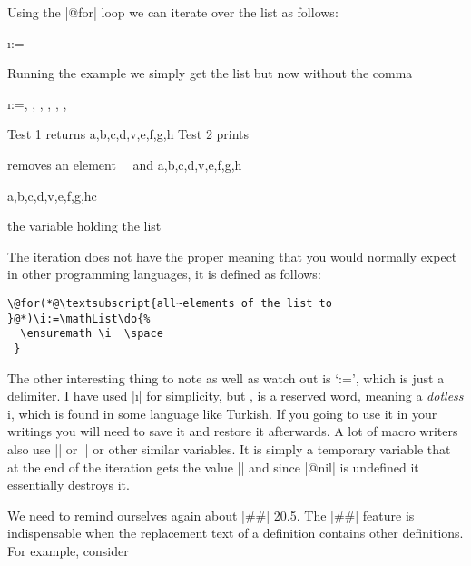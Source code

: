 Using the |@for| loop we can iterate over the list as follows:

\begin{teX}
\@for\i:=\mathList\do{%
  \ensuremath \i  \space 
 }
\end{teX}

\parindent0pt

Running the example we simply get the list but now without the comma

\begin{teX}
\makeatletter
\def\mathList{\alpha, \beta, \gamma, \delta, \epsilon, \zeta, \theta }
\@for\i:=\mathList\do{%
  \ensuremath \i  \space 
 }
\makeatother
\end{teX}




\begin{teX}
\makeatletter
\def\atestiii{}
\def\alist{a,b,c,d,v,e,f,g,h}
Test 1 \@removeelement{v}{a,b,c,d,v,e,f,g,h}{\atestiii} 
returns \atestiii
\alist
\gdef\blist{1,2,3,4,5,v,6,7}%
Test 2 \@removeelement{v}{\expand\blist}{\atestii} prints \atestii
\meaning\atestii
\meaning\@removeelement

\def\remove#1#2{
 \@removeelement #2{#1}\atestiii \atestiii
}

removes an element \atestiii ~~and \alist

\remove c\alist 


the variable holding the list \atestiii
\end{teX}


The iteration does not have the proper meaning that you would normally expect in other programming languages, it is defined as follows:


\begin{verbatim}
\@for(*@\textsubscript{all~elements of the list to }@*)\i:=\mathList\do{%
  \ensuremath \i  \space 
 }
\end{verbatim}

The other interesting thing to note as well as watch out is `:=', which is just a delimiter. I have used |\i| for simplicity, but \cmd{\i}, is a reserved word, meaning a \textit{dotless} i, which is found in some language like Turkish. If you going to use it in your writings you will need to save it and restore it afterwards. A lot of macro writers also use |\ii| or |\@i| or other similar variables. It is simply a temporary variable that at the end of the iteration gets the value |\@nil| and since |@nil| is undefined it essentially destroys it. 

We need to remind ourselves again about |##|
20.5. The |##| feature is indispensable when the replacement text of a definition
contains other definitions. For example, consider


